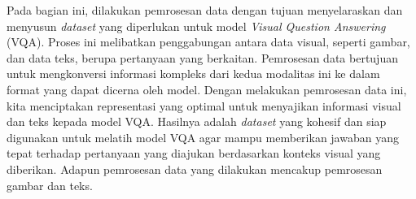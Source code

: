 \par Pada bagian ini, dilakukan pemrosesan data dengan tujuan menyelaraskan dan menyusun \textit{dataset} yang diperlukan untuk model \textit{Visual Question Answering} (VQA). Proses ini melibatkan penggabungan antara data visual, seperti gambar, dan data teks, berupa pertanyaan yang berkaitan. Pemrosesan data bertujuan untuk mengkonversi informasi kompleks dari kedua modalitas ini ke dalam format yang dapat dicerna oleh model. Dengan melakukan pemrosesan data ini, kita menciptakan representasi yang optimal untuk menyajikan informasi visual dan teks kepada model VQA. Hasilnya adalah \textit{dataset} yang kohesif dan siap digunakan untuk melatih model VQA agar mampu memberikan jawaban yang tepat terhadap pertanyaan yang diajukan berdasarkan konteks visual yang diberikan. Adapun pemrosesan data yang dilakukan mencakup pemrosesan gambar dan teks.


